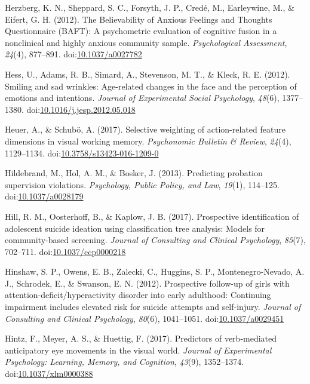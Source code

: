 \documentclass[english,man]{apa6}
\theoremstyle{definition}
\theoremstyle{definition}
\theoremstyle{definition}
\theoremstyle{remark}
\begin{document}
\hypertarget{ref-Herzberg2012}{}
Herzberg, K. N., Sheppard, S. C., Forsyth, J. P., Credé, M., Earleywine,
M., \& Eifert, G. H. (2012). The Believability of Anxious Feelings and
Thoughts Questionnaire (BAFT): A psychometric evaluation of cognitive
fusion in a nonclinical and highly anxious community sample.
\emph{Psychological Assessment}, \emph{24}(4), 877--891.
doi:\href{https://doi.org/10.1037/a0027782}{10.1037/a0027782}

\hypertarget{ref-Hess2012}{}
Hess, U., Adams, R. B., Simard, A., Stevenson, M. T., \& Kleck, R. E.
(2012). Smiling and sad wrinkles: Age-related changes in the face and
the perception of emotions and intentions. \emph{Journal of Experimental
Social Psychology}, \emph{48}(6), 1377--1380.
doi:\href{https://doi.org/10.1016/j.jesp.2012.05.018}{10.1016/j.jesp.2012.05.018}

\hypertarget{ref-Heuer2016}{}
Heuer, A., \& Schubö, A. (2017). Selective weighting of action-related
feature dimensions in visual working memory. \emph{Psychonomic Bulletin
\& Review}, \emph{24}(4), 1129--1134.
doi:\href{https://doi.org/10.3758/s13423-016-1209-0}{10.3758/s13423-016-1209-0}

\hypertarget{ref-Hildebrand2013}{}
Hildebrand, M., Hol, A. M., \& Bosker, J. (2013). Predicting probation
supervision violations. \emph{Psychology, Public Policy, and Law},
\emph{19}(1), 114--125.
doi:\href{https://doi.org/10.1037/a0028179}{10.1037/a0028179}

\hypertarget{ref-Hill2017}{}
Hill, R. M., Oosterhoff, B., \& Kaplow, J. B. (2017). Prospective
identification of adolescent suicide ideation using classification tree
analysis: Models for community-based screening. \emph{Journal of
Consulting and Clinical Psychology}, \emph{85}(7), 702--711.
doi:\href{https://doi.org/10.1037/ccp0000218}{10.1037/ccp0000218}

\hypertarget{ref-Hinshaw2012}{}
Hinshaw, S. P., Owens, E. B., Zalecki, C., Huggins, S. P.,
Montenegro-Nevado, A. J., Schrodek, E., \& Swanson, E. N. (2012).
Prospective follow-up of girls with attention-deficit/hyperactivity
disorder into early adulthood: Continuing impairment includes elevated
risk for suicide attempts and self-injury. \emph{Journal of Consulting
and Clinical Psychology}, \emph{80}(6), 1041--1051.
doi:\href{https://doi.org/10.1037/a0029451}{10.1037/a0029451}

\hypertarget{ref-Hintz2017}{}
Hintz, F., Meyer, A. S., \& Huettig, F. (2017). Predictors of
verb-mediated anticipatory eye movements in the visual world.
\emph{Journal of Experimental Psychology: Learning, Memory, and
Cognition}, \emph{43}(9), 1352--1374.
doi:\href{https://doi.org/10.1037/xlm0000388}{10.1037/xlm0000388}
\end{document}

